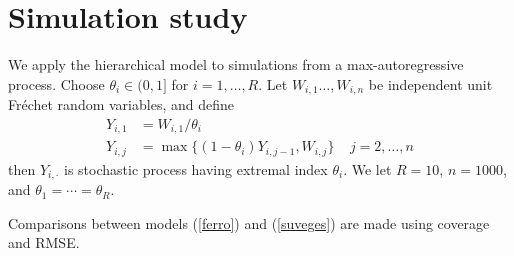 \section{Simulation study}
\label{sim}

We apply the hierarchical model to simulations from a max-autoregressive process. Choose $\theta_i\in(0,1]$ for $i=1,\ldots,R$. Let $W_{i,1}\ldots,W_{i,n}$ be independent unit Fr{\'e}chet random variables, and define
\begin{align}
Y_{i,1} &= W_{i,1}/\theta_i \nonumber \\
Y_{i,j} &= \max\{(1-\theta_i)Y_{i,j-1}, W_{i,j}\}~~~~~j=2,\ldots,n \label{max}
\end{align}
then $Y_{i,\cdot}$ is stochastic process having extremal index $\theta_i$. We let $R=10$, $n=1000$, and $\theta_1=\cdots=\theta_R$.

Comparisons between models (\ref{ferro}) and (\ref{suveges}) are made using coverage and RMSE.

% 

